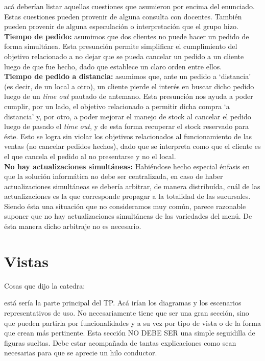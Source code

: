 \documentclass[a4paper,10pt]{article}
\begin{document}
acá deberían listar aquellas cuestiones que asumieron
por encima del enunciado. Estas cuestiones pueden provenir de alguna
consulta con docentes. También pueden provenir de alguna especulación
o interpretación que el grupo hizo.
\noindent
\textbf{Tiempo de pedido:} asumimos que dos clientes no puede hacer un pedido de forma simultánea. Esta presunción permite simplificar el cumplimiento del objetivo relacionado a no dejar que se pueda cancelar un pedido a un cliente luego de que fue hecho, dado que establece un claro orden entre ellos. \\
\textbf{Tiempo de pedido a distancia:} asumimos que, ante un pedido a `distancia' (es decir, de un local a otro), un cliente pierde el interés en buscar dicho pedido luego de un \textit{time out} pautado de antemano. Esta presunción nos ayuda a poder cumplir, por un lado, el objetivo relacionado a permitir dicha compra `a distancia' y, por otro, a poder mejorar el manejo de stock al cancelar el pedido luego de pasado el \textit{time out}, y de esta forma recuperar el stock reservado para éste. Esto se logra sin violar los objetivos relacionados al funcionamiento de las ventas (no cancelar pedidos hechos), dado que se interpreta como que el cliente es el que cancela el pedido al no presentarse y no el local.\\
\textbf{No hay actualizaciones simultáneas:} Habiéndose hecho especial énfasis en que la solución informática no debe ser centralizada, en caso de haber actualizaciones simultáneas se debería arbitrar, de manera distribuída, cuál de las actualizaciones es la que corresponde propagar a la totalidad de las sucursales. Siendo ésta una situación que no consideramos muy común, parece razonable suponer que no hay actualizaciones simultáneas de las variedades del menú. De ésta manera dicho arbitraje no es necesario. \\ 
\newpage
\section*{Vistas}

Cosas que dijo la catedra:

está sería la parte principal del TP. Acá irían los
diagramas y los escenarios representativos de uso. No necesariamente
tiene que ser una gran sección, sino que pueden partirla por
funcionalidades y a su vez por tipo de vista o de la forma que crean
más pertinente. Esta sección NO DEBE SER una simple seguidilla de
figuras sueltas. Debe estar acompañada de tantas explicaciones como
sean necesarias para que se aprecie un hilo conductor.
\end{document}
